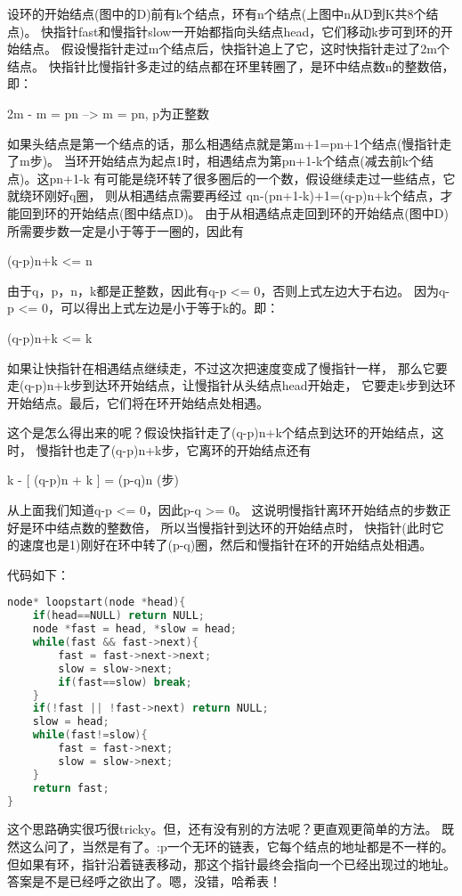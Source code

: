 \begin{description}
设环的开始结点(图中的D)前有k个结点，环有n个结点(上图中n从D到K共8个结点)。 快指针fast和慢指针slow一开始都指向头结点head，它们移动k步可到环的开始结点。 假设慢指针走过m个结点后，快指针追上了它，这时快指针走过了2m个结点。 快指针比慢指针多走过的结点都在环里转圈了，是环中结点数n的整数倍，即：

2m - m = pn --> m = pn, p为正整数

如果头结点是第一个结点的话，那么相遇结点就是第m+1=pn+1个结点(慢指针走了m步)。 当环开始结点为起点1时，相遇结点为第pn+1-k个结点(减去前k个结点)。这pn+1-k 有可能是绕环转了很多圈后的一个数，假设继续走过一些结点，它就绕环刚好q圈， 则从相遇结点需要再经过 qn-(pn+1-k)+1=(q-p)n+k个结点，才能回到环的开始结点(图中结点D)。 由于从相遇结点走回到环的开始结点(图中D)所需要步数一定是小于等于一圈的，因此有

(q-p)n+k <= n 

由于q，p，n，k都是正整数，因此有q-p <= 0，否则上式左边大于右边。 因为q-p <= 0，可以得出上式左边是小于等于k的。即：

(q-p)n+k <= k

如果让快指针在相遇结点继续走，不过这次把速度变成了慢指针一样， 那么它要走(q-p)n+k步到达环开始结点，让慢指针从头结点head开始走， 它要走k步到达环开始结点。最后，它们将在环开始结点处相遇。

这个是怎么得出来的呢？假设快指针走了(q-p)n+k个结点到达环的开始结点，这时， 慢指针也走了(q-p)n+k步，它离环的开始结点还有

k - [ (q-p)n + k ] = (p-q)n (步)

从上面我们知道q-p <= 0，因此p-q >= 0。 这说明慢指针离环开始结点的步数正好是环中结点数的整数倍， 所以当慢指针到达环的开始结点时， 快指针(此时它的速度也是1)刚好在环中转了(p-q)圈，然后和慢指针在环的开始结点处相遇。

代码如下：

\begin{lstlisting}[language=C++]
node* loopstart(node *head){
    if(head==NULL) return NULL;
    node *fast = head, *slow = head;
    while(fast && fast->next){
        fast = fast->next->next;
        slow = slow->next;
        if(fast==slow) break;
    }
    if(!fast || !fast->next) return NULL;
    slow = head;
    while(fast!=slow){
        fast = fast->next;
        slow = slow->next;
    }
    return fast;
}
\end{lstlisting}

这个思路确实很巧很tricky。但，还有没有别的方法呢？更直观更简单的方法。 既然这么问了，当然是有了。:p一个无环的链表，它每个结点的地址都是不一样的。 但如果有环，指针沿着链表移动，那这个指针最终会指向一个已经出现过的地址。 答案是不是已经呼之欲出了。嗯，没错，哈希表！


\end{description}
